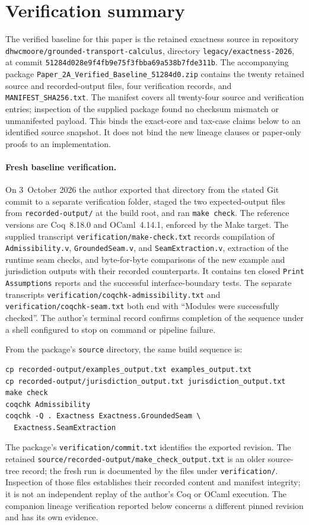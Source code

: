 \documentclass[11pt]{article}
\theoremstyle{definition}
\newcommand{\code}[1]{\texttt{#1}}
\begin{document}
\section{Verification summary}\label{ex:app:verification}

The verified baseline for this paper is the retained exactness source in repository \nolinkurl{dhwcmoore/grounded-transport-calculus}, directory \nolinkurl{legacy/exactness-2026}, at commit \nolinkurl{51284d028e9f4fb9e75f3fbba69a538b7fde311b}. The accompanying package \nolinkurl{Paper_2A_Verified_Baseline_51284d0.zip} contains the twenty retained source and recorded-output files, four verification records, and \nolinkurl{MANIFEST_SHA256.txt}. The manifest covers all twenty-four source and verification entries; inspection of the supplied package found no checksum mismatch or unmanifested payload. This binds the exact-core and tax-case claims below to an identified source snapshot. It does not bind the new lineage clauses or paper-only proofs to an implementation.

\paragraph{Fresh baseline verification.}
On 3~October 2026 the author exported that directory from the stated Git commit to a separate verification folder, staged the two expected-output files from \nolinkurl{recorded-output/} at the build root, and ran \code{make check}. The reference versions are Coq~8.18.0 and OCaml~4.14.1, enforced by the Make target. The supplied transcript \nolinkurl{verification/make-check.txt} records compilation of \code{Admissibility.v}, \code{GroundedSeam.v}, and \code{SeamExtraction.v}, extraction of the runtime seam checks, and byte-for-byte comparisons of the new example and jurisdiction outputs with their recorded counterparts. It contains ten closed \code{Print Assumptions} reports and the successful interface-boundary tests. The separate transcripts \nolinkurl{verification/coqchk-admissibility.txt} and \nolinkurl{verification/coqchk-seam.txt} both end with ``Modules were successfully checked''. The author's terminal record confirms completion of the sequence under a shell configured to stop on command or pipeline failure.

From the package's \code{source} directory, the same build sequence is:
\begin{verbatim}
cp recorded-output/examples_output.txt examples_output.txt
cp recorded-output/jurisdiction_output.txt jurisdiction_output.txt
make check
coqchk Admissibility
coqchk -Q . Exactness Exactness.GroundedSeam \
  Exactness.SeamExtraction
\end{verbatim}
The package's \nolinkurl{verification/commit.txt} identifies the exported revision. The retained \nolinkurl{source/recorded-output/make_check_output.txt} is an older source-tree record; the fresh run is documented by the files under \nolinkurl{verification/}. Inspection of those files establishes their recorded content and manifest integrity; it is not an independent replay of the author's Coq or OCaml execution. The companion lineage verification reported below concerns a different pinned revision and has its own evidence.
\end{document}
